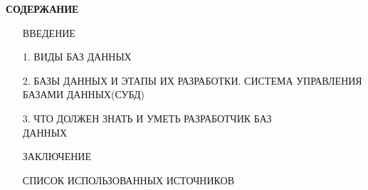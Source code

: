   \begin{center}
  \textbf{СОДЕРЖАНИЕ}
  \end{center}
  \begin{flushleft}
  \begin{enumerate} 
    \item[] ВВЕДЕНИЕ
    \item[1.] ВИДЫ БАЗ ДАННЫХ
    \item[2.] БАЗЫ ДАННЫХ И ЭТАПЫ ИХ РАЗРАБОТКИ. СИСТЕМА УПРАВЛЕНИЯ БАЗАМИ ДАННЫХ(СУБД)
    \item[3.] ЧТО ДОЛЖЕН ЗНАТЬ И УМЕТЬ РАЗРАБОТЧИК БАЗ \\ДАННЫХ 
    \item[] ЗАКЛЮЧЕНИЕ
    \item[] СПИСОК ИСПОЛЬЗОВАННЫХ ИСТОЧНИКОВ
  \end{enumerate}
  \newpage

  \end{flushleft}
  